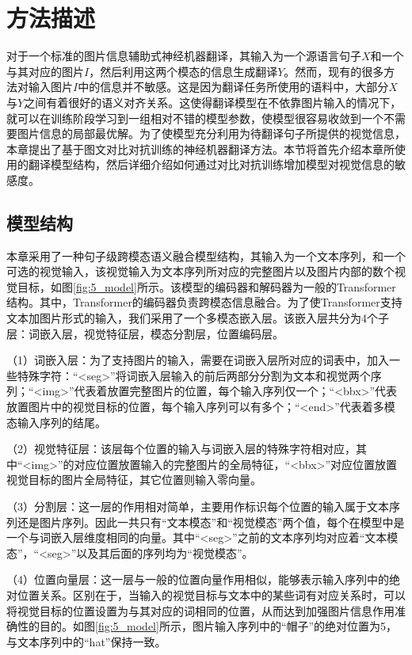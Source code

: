 \section{方法描述}
\label{sec:5_method}

对于一个标准的图片信息辅助式神经机器翻译，其输入为一个源语言句子$X$和一个与其对应的图片$I$，然后利用这两个模态的信息生成翻译$Y$。然而，现有的很多方法对输入图片$I$中的信息并不敏感。这是因为翻译任务所使用的语料中，大部分$X$与$Y$之间有着很好的语义对齐关系。这使得翻译模型在不依靠图片输入的情况下，就可以在训练阶段学习到一组相对不错的模型参数，使模型很容易收敛到一个不需要图片信息的局部最优解。为了使模型充分利用为待翻译句子所提供的视觉信息，本章提出了基于图文对比对抗训练的神经机器翻译方法。本节将首先介绍本章所使用的翻译模型结构，然后详细介绍如何通过对比对抗训练增加模型对视觉信息的敏感度。

\subsection{模型结构}
\label{sec:5_architecture}

本章采用了一种句子级跨模态语义融合模型结构，其输入为一个文本序列，和一个可选的视觉输入，该视觉输入为文本序列所对应的完整图片以及图片内部的数个视觉目标，如图\ref{fig:5_model}所示。该模型的编码器和解码器为一般的Transformer结构。其中，Transformer的编码器负责跨模态信息融合。为了使Transformer支持文本加图片形式的输入，我们采用了一个多模态嵌入层。该嵌入层共分为4个子层：词嵌入层，视觉特征层，模态分割层，位置编码层。

（1）{\sffamily 词嵌入层：}为了支持图片的输入，需要在词嵌入层所对应的词表中，加入一些特殊字符：“<seg>”将词嵌入层输入的前后两部分分割为文本和视觉两个序列；“<img>”代表着放置完整图片的位置，每个输入序列仅一个；“<bbx>”代表放置图片中的视觉目标的位置，每个输入序列可以有多个；“<end>”代表着多模态输入序列的结尾。


（2）{\sffamily 视觉特征层：}该层每个位置的输入与词嵌入层的特殊字符相对应，其中“<img>”的对应位置放置输入的完整图片的全局特征，“<bbx>”对应位置放置视觉目标的图片全局特征，其它位置则输入零向量。


（3）{\sffamily 分割层：}这一层的作用相对简单，主要用作标识每个位置的输入属于文本序列还是图片序列。因此一共只有“文本模态”和“视觉模态”两个值，每个在模型中是一个与词嵌入层维度相同的向量。其中“<seg>”之前的文本序列均对应着“文本模态”，“<seg>”以及其后面的序列均为“视觉模态”。


（4）{\sffamily 位置向量层：}这一层与一般的位置向量作用相似，能够表示输入序列中的绝对位置关系。区别在于，当输入的视觉目标与文本中的某些词有对应关系时，可以将视觉目标的位置设置为与其对应的词相同的位置，从而达到加强图片信息作用准确性的目的。如图\ref{fig:5_model}所示，图片输入序列中的“帽子”的绝对位置为5，与文本序列中的“hat”保持一致。

